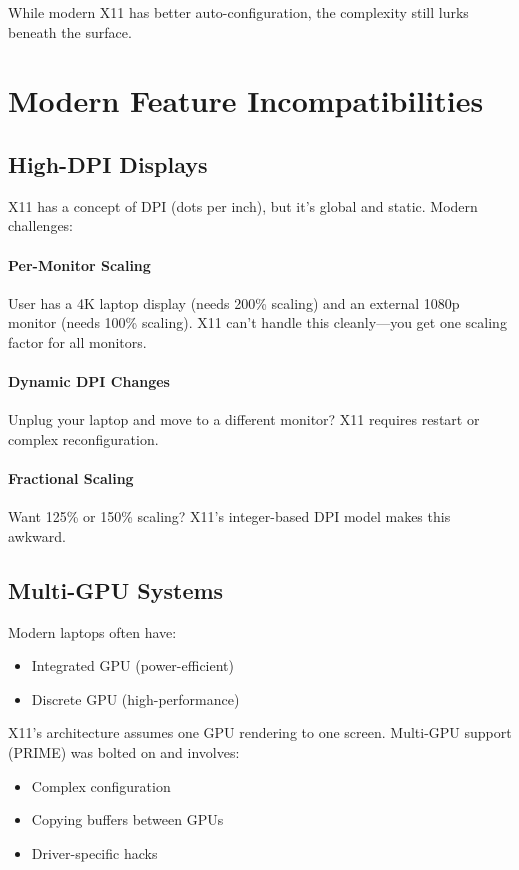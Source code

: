 While modern X11 has better auto-configuration, the complexity still lurks beneath the surface.

\section{Modern Feature Incompatibilities}

\subsection{High-DPI Displays}

X11 has a concept of DPI (dots per inch), but it's global and static. Modern challenges:

\paragraph{Per-Monitor Scaling}
User has a 4K laptop display (needs 200\% scaling) and an external 1080p monitor (needs 100\% scaling). X11 can't handle this cleanly—you get one scaling factor for all monitors.

\paragraph{Dynamic DPI Changes}
Unplug your laptop and move to a different monitor? X11 requires restart or complex reconfiguration.

\paragraph{Fractional Scaling}
Want 125\% or 150\% scaling? X11's integer-based DPI model makes this awkward.

\subsection{Multi-GPU Systems}

Modern laptops often have:
\begin{itemize}
    \item Integrated GPU (power-efficient)
    \item Discrete GPU (high-performance)
\end{itemize}

X11's architecture assumes one GPU rendering to one screen. Multi-GPU support (PRIME) was bolted on and involves:
\begin{itemize}
    \item Complex configuration
    \item Copying buffers between GPUs
    \item Driver-specific hacks
\end{itemize}

